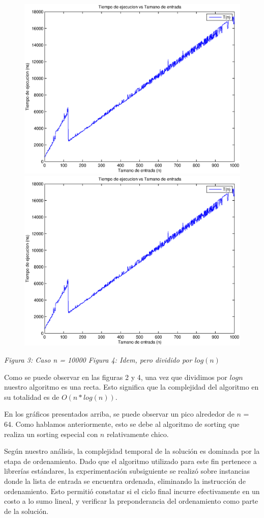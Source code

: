 \begin{figure}[H]
    \includegraphics[width=0.5\linewidth]{problema1/graficos/problema1_aleatoria_1000.eps}
    \includegraphics[width=0.5\linewidth]{problema1/graficos/problema1_aleatoria_1000.eps}
\end{figure}
\emph{\hspace{2,5cm}Figura 3: Caso n = 10000 \hspace{2,5cm}Figura 4: Idem, pero dividido por $log(n)$}

Como se puede observar en las figuras 2 y 4, una vez que dividimos por $log n$ nuestro algoritmo es una recta. Esto significa que la complejidad del algoritmo en su totalidad es de $O(n * log(n))$.

En los gráficos presentados arriba, se puede observar un pico alrededor de $n$ = 64. Como hablamos anteriormente, esto se debe al algoritmo de sorting que realiza un sorting especial con $n$ relativamente chico.

Según nuestro análisis, la complejidad temporal de la solución es dominada por la etapa de ordenamiento. Dado que el algoritmo utilizado para este fin pertenece a librerías estándares, la experimentación subsiguiente se realizó sobre instancias donde la lista de entrada se encuentra ordenada, eliminando la instrucción de ordenamiento. Esto permitió constatar si el ciclo final incurre efectivamente en un costo a lo sumo lineal, y verificar la preponderancia del ordenamiento como parte de la solución.

